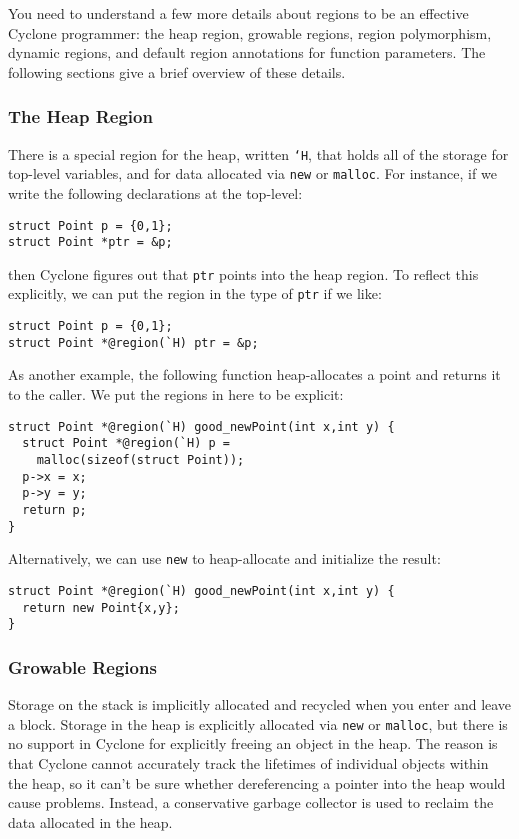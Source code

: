 You need to understand a few more details about regions to
be an effective Cyclone programmer:  the heap region, growable
regions, region polymorphism, dynamic regions, and default region 
annotations for
function parameters.  The following sections give a brief overview
of these details.

\subsubsection*{The Heap Region}

There is a special region for the heap, written \texttt{`H}, that
holds all of the storage for top-level variables, and for data
allocated via \texttt{new} or \texttt{malloc}.  For instance, if we
write the following declarations at the top-level:
\begin{verbatim}
struct Point p = {0,1};
struct Point *ptr = &p;
\end{verbatim}
then Cyclone figures out that \texttt{ptr} points into the heap
region.  To reflect this explicitly, we can put the region in
the type of \texttt{ptr} if we like:
\begin{verbatim}
struct Point p = {0,1};
struct Point *@region(`H) ptr = &p;
\end{verbatim}

As another example, the following function heap-allocates a point and
returns it to the caller.  We put the regions in here to be explicit:
\begin{verbatim}
struct Point *@region(`H) good_newPoint(int x,int y) {
  struct Point *@region(`H) p = 
    malloc(sizeof(struct Point));
  p->x = x;
  p->y = y;
  return p;
}
\end{verbatim}
Alternatively, we can use \texttt{new} to heap-allocate and 
initialize the result:
\begin{verbatim}
struct Point *@region(`H) good_newPoint(int x,int y) {
  return new Point{x,y};
}
\end{verbatim}

\subsubsection*{Growable Regions}

Storage on the stack is implicitly allocated and recycled when you
enter and leave a block.  Storage in the heap is explicitly allocated
via \texttt{new} or \texttt{malloc}, but there is no support in
Cyclone for explicitly freeing an object in the heap.  The reason is
that Cyclone cannot accurately track the lifetimes of individual
objects within the heap, so it can't be sure whether dereferencing a
pointer into the heap would cause problems.  Instead, a conservative
garbage collector is used to reclaim the data allocated in the heap.

